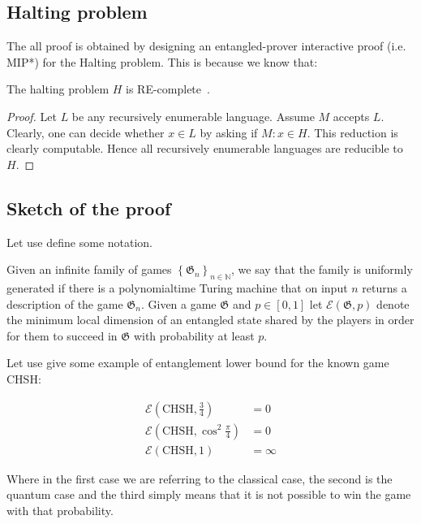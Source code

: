 
\subsection{Halting problem}
The all proof is obtained by designing an entangled-prover interactive proof (i.e. MIP*) for the Halting problem. This is because we know that:
\begin{theorem}
    The halting problem $H$ is RE-complete~\cite{Algorithms}.
\begin{proof}
    Let $L$ be any recursively enumerable language. Assume $M$ accepts $L$. Clearly, one can decide whether $x \in L$ by asking if $M: x \in H$. This reduction is clearly computable. Hence all recursively enumerable languages are reducible to $H$.
\end{proof}
\end{theorem}

\subsection{Sketch of the proof}
Let use define some notation.
\begin{defn}
    Given an infinite family of games $\left\{\mathfrak{G}_{n}\right\}_{n \in \mathbb{N}}$, we say that the family is uniformly generated if there is a polynomialtime Turing machine that on input $n$ returns a description of the game $\mathfrak{G}_{n}$. Given a game $\mathfrak{G}$ and $p \in[0,1]$ let $\mathscr{E}(\mathfrak{G}, p)$ denote the minimum local dimension of an entangled state shared by the players in order for them to succeed in $\mathfrak{G}$ with probability at least $p$.
\end{defn}



Let use give some example of entanglement lower bound for the known game CHSH:

\begin{align}
    \mathscr{E}(\text{CHSH}, \frac{3}{4}) &= 0 \\
    \mathscr{E}(\text{CHSH}, \cos^2{\frac{\pi}{4}}) &= 0 \\
    \mathscr{E}(\text{CHSH}, 1) &= \infty
\end{align}

Where in the first case we are referring to the classical case, the second is the quantum case and the third simply means that it is not possible to win the game with that probability.



